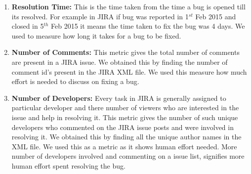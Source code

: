 \begin{enumerate}
	\item \textbf{Resolution Time:} This is the time taken from the time a bug is opened till its resolved. For example in JIRA if bug was reported in 1$ ^{st} $ Feb 2015 and
	closed in 5$ ^{th} $ Feb 2015 it means the time taken to fix the bug was 4 days.
	We used to measure  how
	long it takes for a bug to be fixed.
	
	\item \textbf {Number of Comments:} This metric gives the total number of comments are present in a JIRA
	issue. We obtained this by finding the number of comment id's present
	in the JIRA XML file. We used this measure how much effort is needed to discuss on fixing a bug.
	
	\item \textbf {Number of Developers: } Every task in JIRA is generally assigned to particular developer and
	there number of viewers who are interested in the issue and help in
	resolving it. This metric gives the number of such unique developers
	who commented on the JIRA issue posts and were involved in resolving
	it. We obtained this by finding all the unique author names in the
	XML file. We used this as a metric as it shows human effort needed.
	More number of developers involved and commenting on a issue list,
	signifies more human effort spent resolving the bug.
\end{enumerate}

